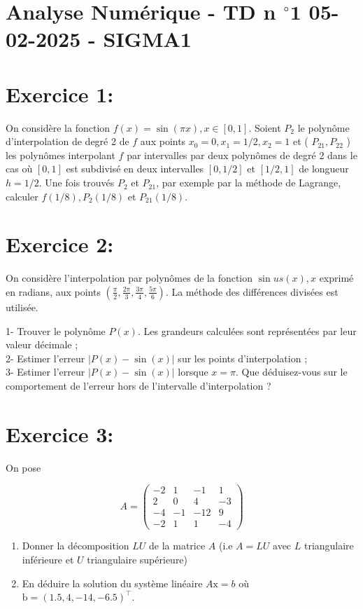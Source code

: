 \documentclass[10pt]{article}
\begin{document}
\section*{Analyse Numérique - TD n \({ }^{\circ} \mathbf{1}\) 05-02-2025 - SIGMA1}
\section*{Exercice 1:}
On considère la fonction \(f(x)=\sin (\pi x), x \in[0,1]\). Soient \(P_{2}\) le polynôme d'interpolation de degré 2 de \(f\) aux points \(x_{0}=0, x_{1}=1 / 2, x_{2}=1\) et ( \(P_{21}, P_{22}\) ) les polynômes interpolant \(f\) par intervalles par deux polynômes de degré 2 dans le cas où \([0,1]\) est subdivisé en deux intervalles \([0,1 / 2]\) et \([1 / 2,1]\) de longueur \(h=1 / 2\). Une fois trouvés \(P_{2}\) et \(P_{21}\), par exemple par la méthode de Lagrange, calculer \(f(1 / 8), P_{2}(1 / 8)\) et \(P_{21}(1 / 8)\).

\section*{Exercice 2:}
On considère l'interpolation par polynômes de la fonction \(\sin u s(x), x\) exprimé en radians, aux points \(\left(\frac{\pi}{2}, \frac{2 \pi}{3}, \frac{3 \pi}{4}, \frac{5 \pi}{6}\right)\). La méthode des différences divisées est utilisée.

1- Trouver le polynôme \(P(x)\). Les grandeurs calculées sont représentées par leur valeur décimale ;\\
2- Estimer l'erreur \(|P(x)-\sin (x)|\) sur les points d'interpolation ;\\
3- Estimer l'erreur \(|P(x)-\sin (x)|\) lorsque \(x=\pi\). Que déduisez-vous sur le comportement de l'erreur hors de l'intervalle d'interpolation ?

\section*{Exercice 3:}
On pose

\[
A=\left(\begin{array}{cccc}
-2 & 1 & -1 & 1 \\
2 & 0 & 4 & -3 \\
-4 & -1 & -12 & 9 \\
-2 & 1 & 1 & -4
\end{array}\right)
\]

\begin{enumerate}
  \item Donner la décomposition \(L U\) de la matrice \(A\) (i.e \(A=L U\) avec \(L\) triangulaire inférieure et \(U\) triangulaire supérieure)
  \item En déduire la solution du système linéaire \(A \mathrm{x}=b\) où \(\mathrm{b}=(1.5,4,-14,-6.5)^{\top}\).
\end{enumerate}
\end{document}
